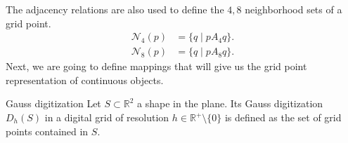 The adjacency relations are also used to define the $4,8$ neighborhood sets of a grid point.~
\begin{align*}
	\mathcal{N}_4(p) &= \{ q \; | \; pA_4q \}. \\
	\mathcal{N}_8(p) &= \{ q \; | \; pA_8q \}.
\end{align*}
Next, we are going to define mappings that will give us the grid point representation of  continuous objects.

\begin{definition}{Gauss digitization}
Let $S \subset \mathbb{R}^2$ a shape in the plane. Its Gauss digitization $D_h(S)$ in a digital grid of resolution $h \in \mathbb{R}^+\setminus \{0\}$ is defined as the set of grid points contained in $S$.
\end{definition}

